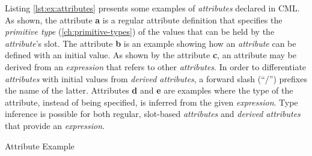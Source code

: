Listing \ref{lst:ex:attributes} presents some examples of \emph{attributes} declared in CML.
As shown,
the attribute \textbf{a} is a regular attribute definition 
that specifies the \emph{primitive type} (\ref{ch:primitive-types})
of the values that can be held by the \emph{attribute}'s slot.
The attribute \textbf{b} is an example showing how an \emph{attribute}
can be defined with an initial value.
As shown by the attribute \textbf{c}, 
an attribute may be derived from an \emph{expression}
that refers to other \emph{attributes}.
In order to differentiate \emph{attributes} with initial values
from \emph{derived attributes},
a forward slash (``/'') prefixes the name of the latter.
Attributes \textbf{d} and \textbf{e} are examples
where the type of the attribute,
instead of being specified,
is inferred from the given \emph{expression}.
Type inference is possible for both regular, slot-based \emph{attributes}
and \emph{derived attributes} that provide an \emph{expression}.

\begin{code}
\verbatimfont{\small}

\caption{Attribute Example}
\label{lst:ex:attributes}
\end{code}
